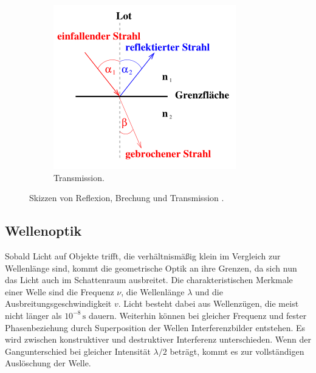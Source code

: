 \begin{figure}
\begin{subfigure}{0.3\textwidth}
        \centering
        \includegraphics{Bilder/Transmission.png}
        \caption{Transmission.}
        \label{fig:Transmission}
    \end{subfigure}
    \caption{Skizzen von Reflexion, Brechung und Transmission \cite{sample}.}
    \label{fig:skizzen}
\end{figure}

\subsection{Wellenoptik}
\label{sec:Wellenoptik}
Sobald Licht auf Objekte trifft, die verhältnismäßig klein im Vergleich zur Wellenlänge sind, kommt die geometrische Optik an ihre
Grenzen, da sich nun das Licht auch im Schattenraum ausbreitet. Die charakteristischen Merkmale einer Welle sind die Frequenz
$\nu$, die Wellenlänge $\lambda$ und die Ausbreitungsgeschwindigkeit $v$. Licht besteht dabei aus Wellenzügen, die meist nicht länger
als $10^{-8}\,\unit{\second}$ dauern. Weiterhin können bei gleicher Frequenz und fester Phasenbeziehung durch Superposition
der Wellen Interferenzbilder entstehen. Es wird zwischen konstruktiver und destruktiver Interferenz unterschieden. Wenn der
Gangunterschied bei gleicher Intensität $\lambda/2$ beträgt, kommt es zur vollständigen Auslöschung der Welle.

